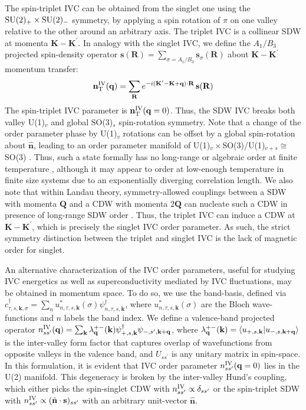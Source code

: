 \documentclass[aps,pra,twocolumn,superscriptaddress,10pt,article,nofootinbib,showpacs,longbibliography]{revtex4-1}
\def \k{{\mathbf k}}
\def \n{{\mathbf n}}
\def \q{{\mathbf q}}
\def \Q{{\mathbf Q}}
\def \s{{\mathbf s}}
\def \R{{\mathbf R}}
\def \K{{\mathbf K}}
\def \Kp{{\mathbf K^\prime}}
\def \R{{\mathbf R}}
\def \beq{\begin{eqnarray}}
\def \eeq{\end{eqnarray}}
\begin{document}
The spin-triplet IVC can be obtained from the singlet one using the $\rm{SU}(2)_+\times \rm{SU}(2)_-$ symmetry, by applying a spin rotation of $\pi$ on one valley relative to the other around an arbitrary axis. The triplet IVC is a collinear SDW at momenta $\K - \K^\prime$.
In analogy with the singlet IVC, we define the $A_1/B_3$ projected spin-density operator $\s(\R) = \sum_{\sigma = A_1/B_3} \s_\sigma(\R)$ about $\K - \K^\prime$ momentum transfer:
\beq
\n^{\rm IV}_{\rm T}(\q) = \sum_{\R} e^{- i(\Kp - \K + \q)\cdot \R} \, \s(\R)
\eeq
The spin-triplet IVC parameter is $\n^{\rm IV}_{\rm T}(\q = 0)$. 
Thus, the SDW IVC breaks both valley U(1)$_v$ and global SO(3)$_s$ spin-rotation symmetry. 
Note that a change of the order parameter phase by U(1)$_v$ rotations can be offset by a global spin-rotation about $\hat{\n}$, leading to an order parameter manifold of U(1)$_v\times$SO(3)/U(1)$_{v+s} \cong$ SO(3) \cite{Mukerjee2006,LS2021,Eyal}.
Thus, such a state formally has no long-range or algebraic order at finite temperature \cite{MW,Chaikin}, although it may appear to order at low-enough temperature in finite size systems due to an exponentially diverging correlation length. 
We also note that within Landau theory, symmetry-allowed couplings between a SDW with momenta $\Q$ and a CDW with momenta $2\Q$ can nucleate such a CDW in presence of long-range SDW order \cite{Zachar1998}. 
Thus, the triplet IVC can induce a CDW at $\K - \K^\prime$, which is precisely the singlet IVC order parameter.
As such, the strict symmetry distinction between the triplet and singlet IVC is the lack of magnetic order for singlet. 

An alternative characterization of the IVC order parameters, useful for studying IVC energetics as well as superconductivity mediated by IVC fluctuations, may be obtained in momentum space.
To do so, we use the band-basis, defined via $c^\dagger_{\tau,s,\k,\sigma} = \sum_{n} u^*_{n,\tau,s,\k}(\sigma) \psi^\dagger_{n,\tau,s,\k}$, where $u^*_{n,\tau,s,\k}(\sigma)$ are the Bloch wave-functions and $n$ labels the band index.
We define a valence-band projected operator $n^{\rm IV}_{s s^\prime}(\q) = \sum_{\k} \lambda^{+-}_{\q}(\k) \psi^\dagger_{+,s,\k} \psi_{-,s^\prime,\k + \q}$, where $\lambda^{+-}_{\q}(\k) = \braket{ u_{+,s,\k} }{ u_{-,s,\k + \q} }$ is the inter-valley form factor that captures overlap of wavefunctions from opposite valleys in the valence band, and $U_{s s^\prime}$ is any unitary matrix in spin-space.
In this formulation, it is evident that IVC order parameter $n^{\rm IV}_{s s^\prime}(\q = 0)$ lies in the U(2) manifold. 
This degeneracy is broken by the inter-valley Hund's coupling, which either picks the spin-singlet CDW with $n^{\rm IV}_{s s^\prime} \propto \delta_{s s^\prime}$ or the spin-triplet SDW with $n^{\rm IV}_{s s^\prime} \propto (\hat{\n} \cdot \s)_{s s^\prime}$ with an arbitrary unit-vector $\hat{\n}$.
\end{document}
